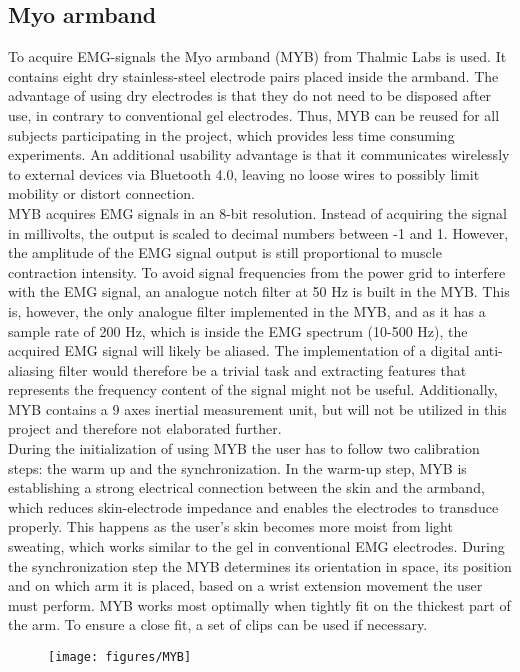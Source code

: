 \subsection{Myo armband}

To acquire EMG-signals the Myo armband (MYB) from Thalmic Labs is used. It contains eight dry stainless-steel electrode pairs placed inside the armband. The advantage of using dry electrodes is that they do not need to be disposed after use, in contrary to conventional gel electrodes. Thus, MYB can be reused for all subjects participating in the project, which provides less time consuming experiments. An additional usability advantage is that it communicates wirelessly to external devices via Bluetooth 4.0, leaving no loose wires to possibly limit mobility or distort connection. \\ 
MYB acquires EMG signals in an 8-bit resolution. Instead of acquiring the signal in millivolts, the output is scaled to decimal numbers between -1 and 1. However, the amplitude of the EMG signal output is still proportional to muscle contraction intensity. To avoid signal frequencies from the power grid to interfere with the EMG signal, an analogue notch filter at 50 Hz is built in the MYB. This is, however, the only analogue filter implemented in the MYB, and as it has a sample rate of 200 Hz, which is inside the EMG spectrum (10-500 Hz), the acquired EMG signal will likely be aliased. The implementation of a digital anti-aliasing filter would therefore be a trivial task and extracting features that represents the frequency content of the signal might not be useful. Additionally, MYB contains a 9 axes inertial measurement unit, but will not be utilized in this project and therefore not elaborated further. \\
During the initialization of using MYB the user has to follow two calibration steps: the warm up and the synchronization. In the warm-up step, MYB is establishing a strong electrical connection between the skin and the armband, which reduces skin-electrode impedance and enables the electrodes to transduce properly. This happens as the user's skin becomes more moist from light sweating, which works similar to the gel in conventional EMG electrodes. During the synchronization step the MYB determines its orientation in space, its position and on which arm it is placed, based on a wrist extension movement the user must perform. 
MYB works most optimally when tightly fit on the thickest part of the arm. To ensure a close fit, a set of clips can be used if necessary. 


\begin{figure}[H]                 
	\texttt{[image: figures/MYB]}  
	\caption{}
	\label{fig:MYB} 
\end{figure}